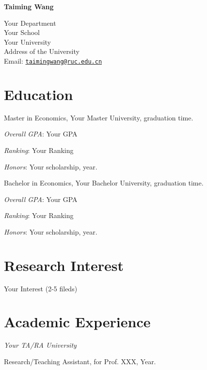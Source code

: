 \documentclass[letterpaper]{article}
\def\name{Taiming Wang}
\renewenvironment{itemize}{
  \begin{list}{}{
    \setlength{\leftmargin}{1em}
  }
}{
  \end{list}
}
\begin{document}
\centerline{\huge\bf \name}
\vspace{0.25in}
\begin{minipage}[t]{0.8\textwidth}
Your Department\\
Your School\\
Your University\\
Address of the University\\
Email: \href{mailto:taimingwang@ruc.edu.cn}{\tt taimingwang@ruc.edu.cn}\\
\end{minipage}

\section*{Education}
\begin{itemize}
\item Master in Economics, Your Master University, graduation time.
    \begin{itemize}
    \item \textit{Overall GPA}: Your GPA
    \item \textit{Ranking}: Your Ranking
    \item \textit{Honors}: Your scholarship, year.
    \end{itemize}
\item Bachelor in Economics, Your Bachelor University, graduation time.
    \begin{itemize}
    \item \textit{Overall GPA}: Your GPA
    \item \textit{Ranking}: Your Ranking
    \item \textit{Honors}: Your scholarship, year.
    \end{itemize}
\end{itemize}

\section*{Research Interest}
Your Interest (2-5 fileds)

\section*{Academic Experience}
\begin{itemize}
\item \emph{Your TA/RA University}
\begin{itemize}
\item Research/Teaching  Assistant,
  for Prof. XXX,
  Year.
\end{itemize}
\end{itemize}
\end{document}
